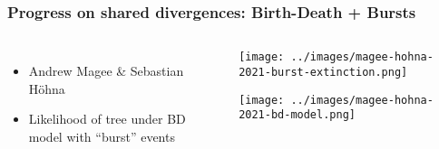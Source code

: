 \begin{frame}[t]
    \frametitle{Progress on shared divergences: Birth-Death + Bursts}

    \begin{columns}

        \begin{minipage}[c][\frametextheight][t]{\columnwidth}
            \begin{itemize}
                \item Andrew Magee \& Sebastian H\"{o}hna
                \item Likelihood of tree under BD model with ``burst'' events
            \end{itemize}
        \end{minipage}


        \begin{minipage}[c][\frametextheight][t]{\columnwidth}
            \begin{center}
                \texttt{[image: ../images/magee-hohna-2021-burst-extinction.png]}

                \smallskip
                \texttt{[image: ../images/magee-hohna-2021-bd-model.png]}
            \end{center}
        \end{minipage}

    \end{columns}

\end{frame}
